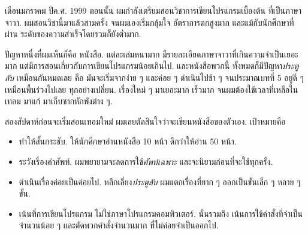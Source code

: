 เดือนมกราคม ปีค.ศ. 1999 ตอนนั้น
ผมกำลังเตรียมสอนวิชาการเขียนโปรแกรมเบื้องต้น
ที่เป็นภาษาจาวา.
ผมสอนวิชานี้มาแล้วสามครั้ง
จนผมเองเริ่มกลุ้มใจ
อัตราการตกสูงมาก
และแม้กับนักศึกษาที่ผ่าน ระดับของความสำเร็จโดยรวมก็ยังต่ำมาก.


ปัญหาหนึ่งที่ผมเห็นก็คือ หนังสือ.
แต่ละเล่มหนามาก
มีรายละเอียดภาษาจาวาที่เกินความจำเป็นเยอะมาก
แต่มีการสอนเกี่ยวกับการเขียนโปรแกรมน้อยเกินไป.
และหนังสือพวกนี้ ทั้งหมดก็มีปัญหา\textit{ประตูลับ} เหมือนกันหมดเลย
คือ มันจะเริ่มจากง่าย ๆ และค่อย ๆ ดำเนินไปช้า ๆ 
จนประมาณบทที่ 5 อยู่ดี ๆ เหมือนพื้นร่วงไปเลย ทุกอย่างเปลี่ยน.
เรื่องใหม่ ๆ มาเยอะมาก เร็วมาก
จนผมต้องใช้เวลาที่เหลือในเทอม มาแก้ มาเก็บซากหักพังต่าง ๆ.


สองสัปดาห์ก่อนจะเริ่มสอนเทอมใหม่
ผมเลยตัดสินใจว่าจะเขียนหนังสือของตัวเอง.
เป้าหมายคือ

\begin{itemize}


\item ทำให้สั้นกระชับ.
ให้นักศึกษาอ่านหนังสือ 10 หน้า ดีกว่าให้อ่าน 50 หน้า.


\item ระวังเรื่องคำศัพท์.
ผมพยายามจะลดการใช้\textit{ศัพท์เฉพาะ}
และจะนิยามก่อนที่จะใช้ทุกครั้ง.


\item ดำเนินเรื่องค่อยเป็นค่อยไป.
หลีกเลี่ยง\textit{ประตูลับ}
ผมแตกเรื่องที่ยาก ๆ ออกเป็นขั้นเล็ก ๆ หลาย ๆ ขั้น.


\item เน้นที่การเขียนโปรแกรม ไม่ใช่ภาษาโปรแกรมคอมพิวเตอร์.
นั่นรวมถึง เน้นการใช้คำสั่งที่จำเป็นจำนวนน้อย ๆ และตัดพวกคำสั่งจำนวนมาก ที่ไม่ค่อยจำเป็นออกไป.

\end{itemize}

